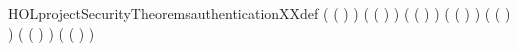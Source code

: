\begin{SaveVerbatim}{HOLprojectSecurityTheoremsauthenticationXXdef}
   ( (  ) \HOLSymConst{\HOLTokenEquiv{}} ) \HOLSymConst{\HOLTokenConj{}}
   ( (  ) \HOLSymConst{\HOLTokenEquiv{}} ) \HOLSymConst{\HOLTokenConj{}}
   ( (  ) \HOLSymConst{\HOLTokenEquiv{}} ) \HOLSymConst{\HOLTokenConj{}}
   ( (  ) \HOLSymConst{\HOLTokenEquiv{}} ) \HOLSymConst{\HOLTokenConj{}}
   ( (  ) \HOLSymConst{\HOLTokenEquiv{}} ) \HOLSymConst{\HOLTokenConj{}}
   ( (  ) \HOLSymConst{\HOLTokenEquiv{}} ) \HOLSymConst{\HOLTokenConj{}}
   ( (  ) \HOLSymConst{\HOLTokenEquiv{}} )
\end{SaveVerbatim}
\newcommand{\HOLprojectSecurityTheoremsauthenticationXXdef}{\UseVerbatim{HOLprojectSecurityTheoremsauthenticationXXdef}}
